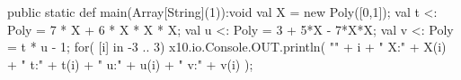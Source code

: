 %
%
%
%
%
%
%
%
%
%


\begin{xten}
  public static def main(Array[String](1)):void {
     val X = new Poly([0,1]);
     val t <: Poly = 7 * X + 6 * X * X * X; 
     val u <: Poly = 3 + 5*X - 7*X*X;
     val v <: Poly = t * u - 1;
     for( [i] in -3 .. 3) {
       x10.io.Console.OUT.println(
         "" + i + "	X:" + X(i) + "	t:" + t(i) 
         + "	u:" + u(i) + "	v:" + v(i)
         );
     }
  }

\end{xten}

